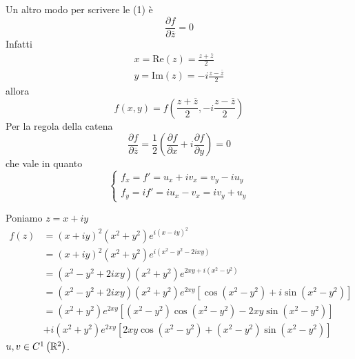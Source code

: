 \begin{rem}
Un altro modo per scrivere le (1) è
\begin{equation*}
\frac{\partial f}{\partial \overline{z}} =0
\end{equation*}
Infatti
\begin{equation*}
\begin{array}{ l }
x=\mathrm{Re}\left( z\right) =\frac{z+\overline{z}}{2}\\
y=\mathrm{Im}\left( z\right) =-i\frac{z-\overline{z}}{2}
\end{array}
\end{equation*}
allora
\begin{equation*}
f\left( x,y\right) =f\left(\frac{z+\overline{z}}{2} ,-i\frac{z-\overline{z}}{2}\right)
\end{equation*}
Per la regola della catena
\begin{equation*}
\frac{\partial f}{\partial \overline{z}} =\frac{1}{2}\left(\frac{\partial f}{\partial x} +i\frac{\partial f}{\partial y}\right) =0
\end{equation*}
che vale in quanto
\begin{equation*}
\begin{cases}
f_{x} =f'=u_{x} +iv_{x} =v_{y} -iu_{y}\\
f_{y} =if'=iu_{x} -v_{x} =iv_{y} +u_{y}
\end{cases}
\end{equation*}
\end{rem}
Poniamo $z=x+iy$
\begin{align*}
f\left( z\right) & =\left( x+iy\right)^{2}\left( x^{2} +y^{2}\right) e^{i\left( x-iy\right)^{2}}\\
 & =\left( x+iy\right)^{2}\left( x^{2} +y^{2}\right) e^{i\left( x^{2} -y^{2} -2ixy\right)}\\
 & =\left( x^{2} -y^{2} +2ixy\right)\left( x^{2} +y^{2}\right) e^{2xy+i\left( x^{2} -y^{2}\right)}\\
 & =\left( x^{2} -y^{2} +2ixy\right)\left( x^{2} +y^{2}\right) e^{2xy}\left[\cos\left( x^{2} -y^{2}\right) +i\sin\left( x^{2} -y^{2}\right)\right]\\
 & =\left( x^{2} +y^{2}\right) e^{2xy}\left[\left( x^{2} -y^{2}\right)\cos\left( x^{2} -y^{2}\right) -2xy\sin\left( x^{2} -y^{2}\right)\right]\\
 & +i\left( x^{2} +y^{2}\right) e^{2xy}\left[ 2xy\cos\left( x^{2} -y^{2}\right) +\left( x^{2} -y^{2}\right)\sin\left( x^{2} -y^{2}\right)\right]
\end{align*}
$u,v\in C^{1}\left(\mathbb{R} ^{2}\right)$.

